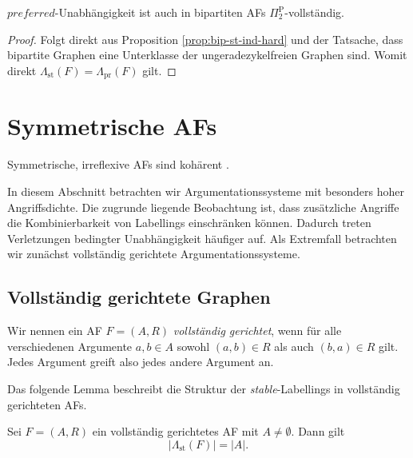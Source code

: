 \begin{Proposition}
    \label{prop:bip-prf-ind-hard}
    \(preferred\)-Unabhängigkeit ist auch in bipartiten AFs \(\Pi_2^{\mathrm{P}}\)-vollständig.
\end{Proposition}

\begin{proof}
    Folgt direkt aus Proposition \ref{prop:bip-st-ind-hard} und der Tatsache, dass 
    bipartite Graphen eine Unterklasse der ungeradezykelfreien Graphen sind. Womit direkt
    \(\Lambda_{\mathrm{st}}(F)=\Lambda_{\mathrm{pr}}(F)\) gilt. 
\end{proof}

\iffalse

\section{Symmetrische AFs}
\label{sec:sym-afs}

Symmetrische, irreflexive AFs sind kohärent \textcite{Coste:2005:symmetric-af-irflx-coherent}.

In diesem Abschnitt betrachten wir Argumentationssysteme mit besonders hoher
Angriffsdichte. Die zugrunde liegende Beobachtung ist, dass zusätzliche Angriffe
die Kombinierbarkeit von Labellings einschränken können. Dadurch treten
Verletzungen bedingter Unabhängigkeit häufiger auf. Als Extremfall betrachten
wir zunächst vollständig gerichtete Argumentationssysteme.

\subsection{Vollständig gerichtete Graphen}
\label{subsec:cdg-afs}

Wir nennen ein AF \(F=(A,R)\) \emph{vollständig gerichtet}, wenn für alle
verschiedenen Argumente \(a,b\in A\) sowohl \((a,b)\in R\) als auch
\((b,a)\in R\) gilt. Jedes Argument greift also jedes andere Argument an.

Das folgende Lemma beschreibt die Struktur der \textit{stable}-Labellings in
vollständig gerichteten AFs.

\begin{Lemma}
    \label{lem:cdg-afs-labellings}
    Sei \(F=(A,R)\) ein vollständig gerichtetes AF mit \(A\neq\emptyset\).
    Dann gilt
    \[
        |\Lambda_{\mathrm{st}}(F)|=|A|.
    \]
\end{Lemma}


